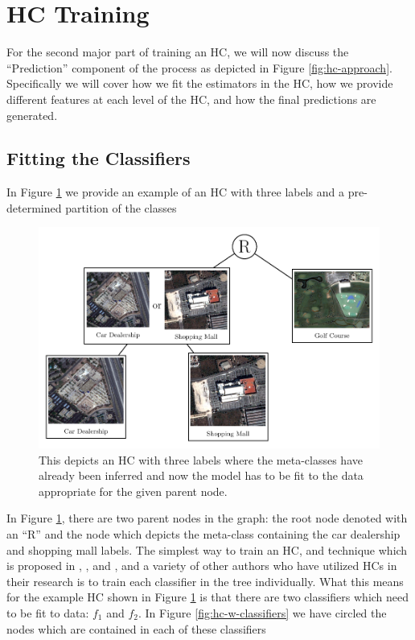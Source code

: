 \documentclass[../thesis.tex]{subfiles}
\begin{document}
\section{HC Training}
\label{hc-training}
For the second major part of training an HC, we will now discuss the ``Prediction'' component of the process as depicted in Figure \ref{fig:hc-approach}. Specifically we will cover how we fit the estimators in the HC, how we provide different features at each level of the HC, and how the final predictions are generated.

\subsection{Fitting the Classifiers}
In Figure \ref{fig:example-hc} we provide an example of an HC with three labels and a pre-determined partition of the classes

\begin{figure}
    \centering
    \includegraphics[width=\linewidth]{images/example-hc.pdf}
    \caption[Example Hierarchical Classifier]{This depicts an HC with three labels where the meta-classes have already been inferred and now the model has to be fit to the data appropriate for the given parent node.}
    \label{fig:example-hc}
\end{figure}

In Figure \ref{fig:example-hc}, there are two parent nodes in the graph: the root node denoted with an ``R'' and the node which depicts the meta-class containing the car dealership and shopping mall labels. The simplest way to train an HC, and technique which is proposed in \cite{yan2015hd}, \cite{bengio2010label}, and \cite{aly2005survey}, and a variety of other authors who have utilized HCs in their research is to train each classifier in the tree individually. What this means for the example HC shown in Figure \ref{fig:example-hc} is that there are two classifiers which need to be fit to data: $f_1$ and $f_2$. In Figure \ref{fig:hc-w-classifiers} we have circled the nodes which are contained in each of these classifiers
\end{document}
